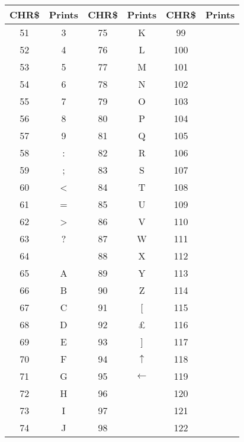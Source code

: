 \newpage



\begin{center}
\begin{longtable}{ c c | c c  | c c}
	\textbf{CHR\$} & \textbf{Prints} & \textbf{CHR\$} & \textbf{Prints} & \textbf{CHR\$} & \textbf{Prints}\\
  \hline
	\endhead

	51	&	3		&	75	&	K					&	99	& \graphicsymbol{C}\\
	52	&	4		&	76	&	L					&	100	& \graphicsymbol{D}\\
	53	&	5		&	77	&	M					&	101	& \graphicsymbol{E}\\
	54	&	6		&	78	&	N					&	102	& \graphicsymbol{F}\\
	55	&	7		&	79	&	O					&	103	& \graphicsymbol{G}\\
	56	&	8		&	80	& P						&	104	& \graphicsymbol{H}\\
	57	&	9		&	81	& Q						&	105	& \graphicsymbol{I}\\
	58	&	:		&	82	& R						&	106	& \graphicsymbol{J}\\
	59	&	;		&	83	& S						&	107	& \graphicsymbol{K}\\
	60	&	<		&	84	& T						&	108	& \graphicsymbol{L}\\
	61	&	=		&	85	& U						&	109	& \graphicsymbol{M}\\
	62	&	>		&	86	& V						&	110	& \graphicsymbol{N}\\
	63	&	?		&	87	& W						&	111	& \graphicsymbol{O}\\
	64	&	\@		&	88	& X						&	112	& \graphicsymbol{P}\\
	65	&	A		&	89	& Y						&	113	& \graphicsymbol{Q}\\
	66	&	B		&	90	& Z						&	114	& \graphicsymbol{R}\\
	67	&	C		&	91	& [						&	115	& \graphicsymbol{S}\\
	68	&	D		&	92	& \pounds				&	116	& \graphicsymbol{T}\\
	69	&	E		&	93	& ]						&	117	& \graphicsymbol{U}\\
	70	&	F		&	94	& $\uparrow$			&	118	& \graphicsymbol{V}\\
	71	&	G		&	95	& $\leftarrow$			&	119	& \graphicsymbol{W}\\
	72	&	H		&	96	& \graphicsymbol{C}		&	120	& \graphicsymbol{X}\\
	73	&	I		&	97	& \graphicsymbol{A}		&	121	& \graphicsymbol{Y}\\
	74	&	J		&	98	& \graphicsymbol{B}		&	122	& \graphicsymbol{Z}\\

\end{longtable}
\end{center}



